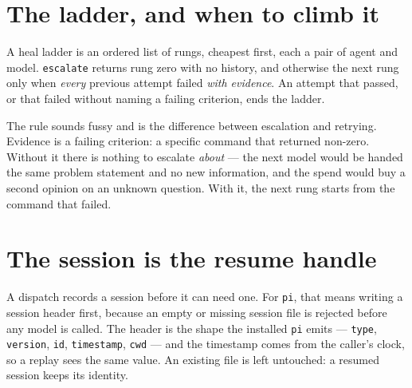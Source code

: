\section{The ladder, and when to climb it}

A heal ladder is an ordered list of rungs, cheapest first, each a pair of agent and model.
\texttt{escalate} returns rung zero with no history, and otherwise the next rung only when
\emph{every} previous attempt failed \emph{with evidence}. An attempt that passed, or that
failed without naming a failing criterion, ends the ladder.

The rule sounds fussy and is the difference between escalation and retrying. Evidence is a
failing criterion: a specific command that returned non-zero. Without it there is nothing to
escalate \emph{about} --- the next model would be handed the same problem statement and no new
information, and the spend would buy a second opinion on an unknown question. With it, the
next rung starts from the command that failed.

\begin{center}
\end{center}

\section{The session is the resume handle}

A dispatch records a session before it can need one. For \texttt{pi}, that means writing a
session header first, because an empty or missing session file is rejected before any model is
called. The header is the shape the installed \texttt{pi} emits --- \texttt{type},
\texttt{version}, \texttt{id}, \texttt{timestamp}, \texttt{cwd} --- and the timestamp comes
from the caller's clock, so a replay sees the same value. An existing file is left untouched:
a resumed session keeps its identity.

